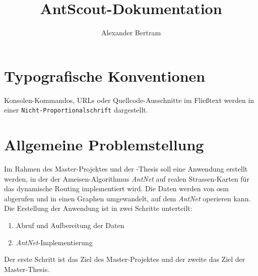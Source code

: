 \documentclass[
  a4paper,
  10pt
]{scrreprt}
\author{Alexander Bertram}
\title{AntScout-Dokumentation}
\begin{document}
\maketitle



\printglossary[
  title = Abkürzungsverzeichnis,
  toctitle = Abkürzungsverzeichnis
]

\chapter{Typografische Konventionen}
\label{chap:typografische-konventionen}

Konsolen-Kommandos, URLs oder Quellcode-Ausschnitte im Fließtext werden in einer \texttt{Nicht-Proportionalschrift} dargestellt.

\chapter{Allgemeine Problemstellung}
\label{chap:allgemeine-problemstellung}

Im Rahmen des Master-Projektes und der -Thesis soll eine Anwendung erstellt werden, in der der Ameisen-Algorithmus \textit{AntNet} auf realen Strassen-Karten für das dynamische Routing implementiert wird.
Die Daten werden von \gls{osm} abgerufen und in einen Graphen umgewandelt, auf dem \textit{AntNet} operieren kann.
Die Erstellung der Anwendung ist in zwei Schritte unterteilt:

\begin{enumerate}
  \item Abruf und Aufbereitung der Daten
  \item \textit{AntNet}-Implementierung
\end{enumerate}

Der erste Schritt ist das Ziel des Master-Projektes und der zweite das Ziel der Master-Thesis.






\end{document}
